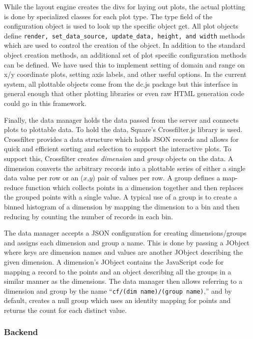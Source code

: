 \documentclass[letter,twocolumn]{article}
\begin{document}
While the layout engine creates the divs for laying out plots, the actual plotting is done by specialized classes for each plot type.
The type field of the configuration object is used to look up the specific object get.
All plot objects define {\tt render, set\_data\_source, update\_data, height, and width} methods which are used to control the creation of the object.
In addition to the standard object creation methods, an additional set of plot specific configuration methods can be defined.
We have used this to implement setting of domain and range on x/y coordinate plots, setting axis labels, and other useful options.
In the current system, all plottable objects come from the dc.js package but this interface in general enough that other plotting libraries or even raw HTML generation code could go in this framework.

Finally, the data manager holds the data passed from the server and connects plots to plottable data.
To hold the data, Square's Crossfilter.js\cite{crossfilter} library is used.
Crossfilter provides a data structure which holds JSON records and allows for quick and efficient sorting and selection to support the interactive plots.
To support this, Crossfilter creates \emph{dimension} and \emph{group} objects on the data.
A dimension converts the arbitrary records into a plottable series of either a single data value per row or an ($x$,$y$) pair of values per row.
A group defines a map-reduce function which collects points in a dimension together and then replaces the grouped points with a single value.
A typical use of a group is to create a binned histogram of a dimension by mapping the dimension to a bin and then reducing by counting the number of records in each bin.

The data manager accepts a JSON configuration for creating dimensions/groups and assigns each dimension and group a name.  
This is done by passing a JObject where keys are dimension names and values are another JObject describing the given dimension.
A dimension's JObject contains the JavaScript code for mapping a record to the points and an object describing all the groups in a similar manner as the dimensions.
The data manager then allows referring to a dimension and group by the name ``{\tt cf/(dim name)/(group name)},'' and by default, creates a null group which uses an identity mapping for points and returns the count for each distinct value.

\subsubsection{Backend}\label{sec:backend}
\end{document}
